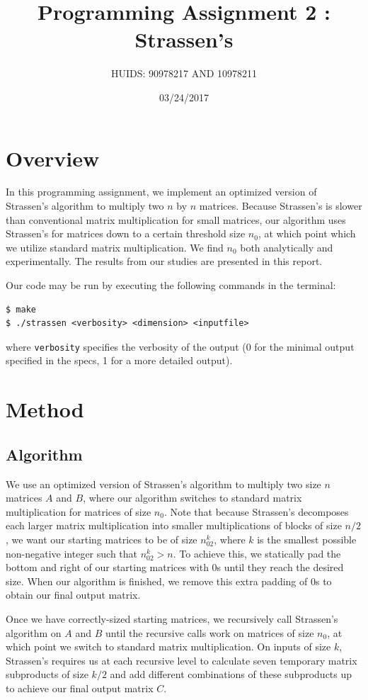 \documentclass[a4paper]{article}
\title{Programming Assignment 2 : Strassen's}
\author{HUIDS: 90978217 AND 10978211}
\date{03/24/2017}
\begin{document}
\maketitle

\section{Overview}
In this programming assignment, we implement an optimized version of Strassen's algorithm to multiply two $n$ by $n$ matrices. Because Strassen's is slower than conventional matrix multiplication for small matrices, our algorithm uses Strassen's for matrices down to a certain threshold size $n_0$, at which point which we utilize standard matrix multiplication. We find $n_0$ both analytically and experimentally. The results from our studies are presented in this report.

Our code may be run by executing the following commands in the terminal:
\begin{verbatim}
$ make
$ ./strassen <verbosity> <dimension> <inputfile>
\end{verbatim}
where \texttt{verbosity} specifies the verbosity of the output (0 for the minimal output specified in the specs, 1 for a more detailed output).

\section{Method}
\subsection{Algorithm}
We use an optimized version of Strassen's algorithm to multiply two size $n$ matrices $A$ and $B$, where our algorithm switches to standard matrix multiplication for matrices of size $n_0$. Note that because Strassen's decomposes each larger matrix multiplication into smaller multiplications of blocks of size $n/2$, we want our starting matrices to be of size $n_02^k$, where $k$ is the smallest possible non-negative integer such that $n_02^k > n$. To achieve this, we statically pad the bottom and right of our starting matrices with 0s until they reach the desired size. When our algorithm is finished, we remove this extra padding of 0s to obtain our final output matrix.

Once we have correctly-sized starting matrices, we recursively call Strassen's algorithm on $A$ and $B$ until the recursive calls work on matrices of size $n_0$, at which point we switch to standard matrix multiplication. On inputs of size $k$, Strassen's requires us at each recursive level to calculate seven temporary matrix subproducts of size $k/2$ and add different combinations of these subproducts up to achieve our final output matrix $C$. 
\end{document}
